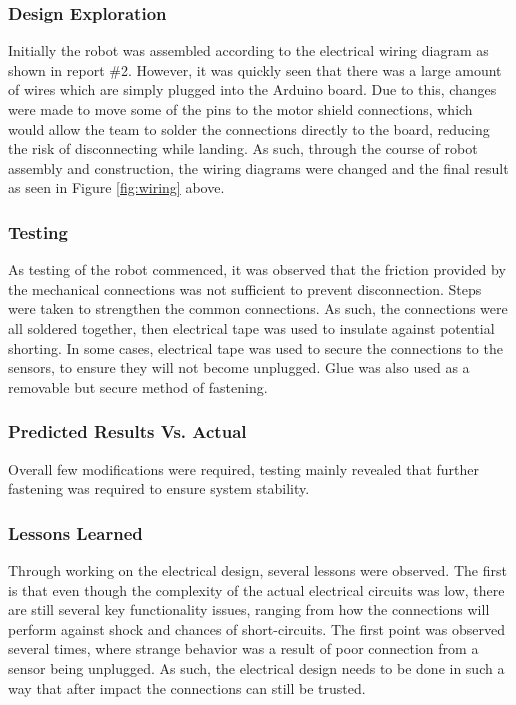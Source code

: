 \documentclass[ece]{uw-wkrpt}
\begin{document}
\subsubsection{Design Exploration} 

Initially the robot was assembled according to the electrical wiring diagram as shown in report \#2. However, it was quickly seen that there was a large amount of wires which are simply plugged into the Arduino board. Due to this, changes were made to move some of the pins to the motor shield connections, which would allow the team to solder the connections directly to the board, reducing the risk of disconnecting while landing. As such, through the course of robot assembly and construction, the wiring diagrams were changed and the final result as seen in Figure \ref{fig:wiring} above.

\subsubsection{Testing} 

As testing of the robot commenced, it was observed that the friction provided by the mechanical connections was not sufficient to prevent disconnection. Steps were taken to strengthen the common connections. As such, the connections were all soldered together, then electrical tape was used to insulate against potential shorting. In some cases, electrical tape was used to secure the connections to the sensors, to ensure they will not become unplugged. Glue was also used as a removable but secure method of fastening.

\subsubsection{Predicted Results Vs. Actual} 

Overall few modifications were required, testing mainly revealed that further fastening was required to ensure system stability.

\subsubsection{Lessons Learned}

Through working on the electrical design, several lessons were observed. The first is that even though the complexity of the actual electrical circuits was low, there are still several key functionality issues, ranging from how the connections will perform against shock and chances of short-circuits. The first point was observed several times, where strange behavior was a result of poor connection from a sensor being unplugged. As such, the electrical design needs to be done in such a way that after impact the connections can still be trusted. 
\end{document}
